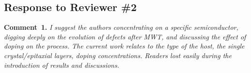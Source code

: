 \documentclass[10pt]{iopart}
\begin{document}
%
%
%
%




\subsection*{Response to Reviewer \#2 }
\noindent
\textcolor[rgb]{0.00,0.50,1.00}{\textbf{Comment~1.}}
\emph{I suggest the authors concentrating on a specific semiconductor,
digging deeply on the evolution of defects after MWT,
and discussing the effect of doping on the process.
The current work relates to the type of the host,
the single crystal/epitaxial layers, doping concentrations.
Readers lost easily during the introduction of results and discussions.}
\end{document}
